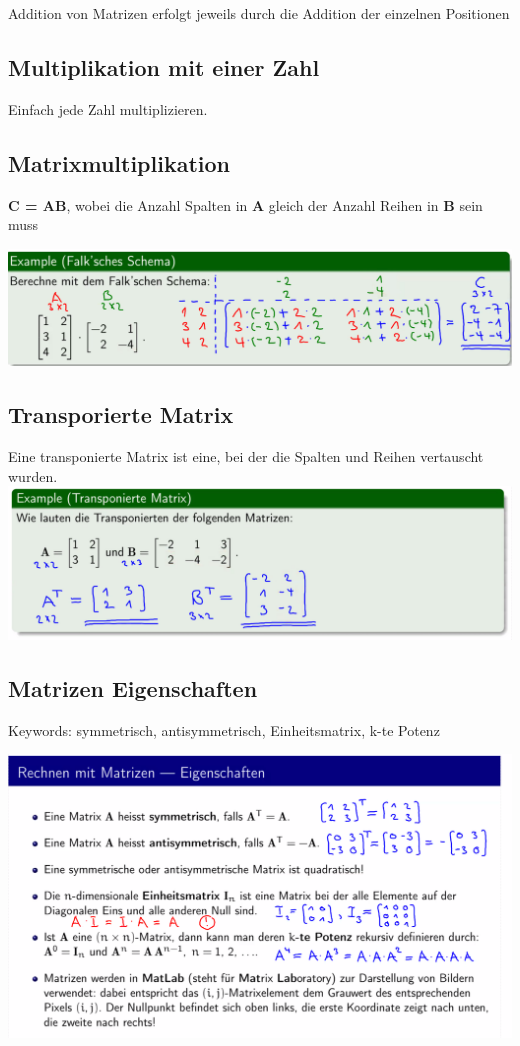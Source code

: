 \documentclass[12pt]{scrartcl}
\begin{document}
Addition von Matrizen erfolgt jeweils durch die Addition der einzelnen Positionen


\subsection{Multiplikation mit einer Zahl}
Einfach jede Zahl multiplizieren.


\subsection{Matrixmultiplikation}
\textbf{C = AB}, wobei die Anzahl Spalten in \textbf{A} gleich der Anzahl Reihen in \textbf{B}
sein muss

\includegraphics[width=15cm]{img/matrizenmultiplikation.png}

\subsection{Transporierte Matrix}
Eine transponierte Matrix ist eine, bei der die Spalten und Reihen vertauscht wurden.\\

\includegraphics[width=15cm]{img/transponierte_matrix.png}

\subsection{Matrizen Eigenschaften}
Keywords: symmetrisch, antisymmetrisch, Einheitsmatrix, k-te Potenz

\includegraphics[width=16cm]{img/matrizen_eigenschaften.png}
\end{document}

